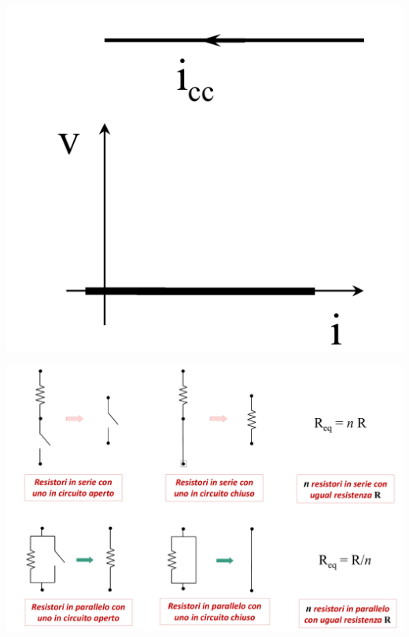 \documentclass{article}
\begin{document}
\begin{center}
    \includegraphics[scale=0.35]{Image/Circuito chiuso.png}
\end{center}
\begin{center}
    \includegraphics[scale=0.3]{Image/Resistori aperto chiuso.png}
\end{center}
\end{document}
